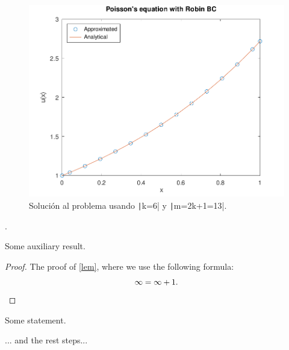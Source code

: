 \begin{problem}
\begin{figure}[ht!]
    \centering
    \includegraphics[width=.6\paperwidth]{../examples/octave/elliptic1D.pdf}
    \caption{Solución al problema usando \texttt|k=6| y \texttt|m=2k+1=13|.}
\end{figure}

\noQED %
\end{problem}

\begin{problem}
.
\end{problem}

\begin{solution}
    \begin{lemma}\label{lem}
        Some auxiliary result.
    \end{lemma}
    \begin{proof}
        The proof of \cref{lem}, where we use the following formula:
        \[
            \infty = \infty + 1.
            \qedhere %
        \]
    \end{proof}
    \begin{fact}
        \proofless %
        Some statement.
    \end{fact}
    ... and the rest steps...

\end{solution}